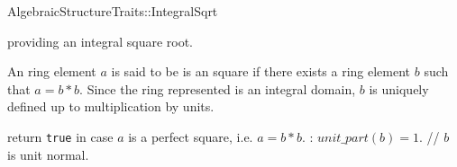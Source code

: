 

\begin{ccRefConcept}{AlgebraicStructureTraits::IntegralSqrt}

\begin{ccAdvanced}
\ccDefinition

 providing an integral square root. 

An ring element $a$ is said to be is an square if there exists a ring element $b$ such 
that $a= b*b$. Since the ring represented is an integral domain, 
$b$ is uniquely defined up to multiplication by units. 

\ccRefines 


\ccTypes

\ccGlue
{}\ccGlue
{}

\ccOperations
{}
        { return {\tt true} in case $a$ is a perfect square, i.e. $a = b*b$.
          \ccPostcond: $unit\_part(b) = 1$. // $b$ is unit normal. 
        }


\ccSeeAlso

\end{ccAdvanced}

\end{ccRefConcept} 